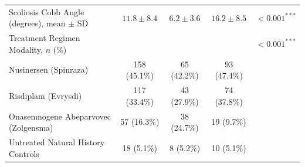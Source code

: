 \documentclass[journal]{IEEEtran}
\begin{document}
\begin{table}[!t]
\begin{tabular}{lcccc}
Scoliosis Cobb Angle (degrees), mean $\pm$ SD & $11.8 \pm 8.4$ & $6.2 \pm 3.6$ & $16.2 \pm 8.5$ & $< 0.001^{***}$ \\
Treatment Regimen Modality, $n$ (\%) & & & & $< 0.001^{***}$ \\
\quad Nusinersen (Spinraza) & 158 (45.1\%) & 65 (42.2\%) & 93 (47.4\%) & \\
\quad Risdiplam (Evrysdi) & 117 (33.4\%) & 43 (27.9\%) & 74 (37.8\%) & \\
\quad Onasemnogene Abeparvovec (Zolgensma) & 57 (16.3\%) & 38 (24.7\%) & 19 (9.7\%) & \\
\quad Untreated Natural History Controls & 18 (5.1\%) & 8 (5.2\%) & 10 (5.1\%) & \\
\bottomrule
\end{tabular}
\end{table}
\end{document}
